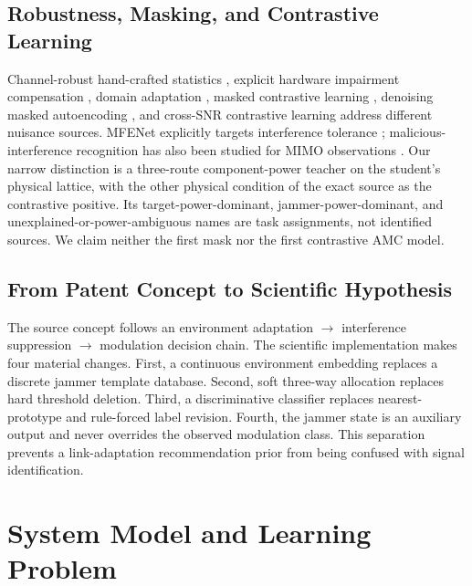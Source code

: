 \documentclass[letterpaper,journal]{IEEEtran}
\begin{document}
\subsection{Robustness, Masking, and Contrastive Learning}
Channel-robust hand-crafted statistics \cite{huang2024csqcc}, explicit hardware
impairment compensation \cite{ren2024crosssknet}, domain adaptation
\cite{wang2024sigda,li2026cgpcda}, masked contrastive learning
\cite{xiao2024mclhn}, denoising masked autoencoding
\cite{faysal2026denomae}, and cross-SNR contrastive learning
\cite{wu2026caic} address different nuisance sources.  MFENet explicitly
targets interference tolerance \cite{sun2025mfenet}; malicious-interference
recognition has also been studied for MIMO observations
\cite{zhang2026malicious}.  Our narrow distinction is a three-route
component-power teacher on the student's physical lattice, with the other
physical condition of the exact source as the contrastive positive.  Its
target-power-dominant, jammer-power-dominant, and
unexplained-or-power-ambiguous names are task assignments, not identified
sources.  We claim neither the first mask nor the first contrastive AMC model.

\subsection{From Patent Concept to Scientific Hypothesis}
The source concept follows an environment adaptation $\rightarrow$
interference suppression $\rightarrow$ modulation decision chain.  The
scientific implementation makes four material changes.  First, a continuous
environment embedding replaces a discrete jammer template database. Second,
soft three-way allocation replaces hard threshold deletion. Third, a
discriminative classifier replaces nearest-prototype and rule-forced label
revision. Fourth, the jammer state is an auxiliary output and never overrides
the observed modulation class.  This separation prevents a link-adaptation
recommendation prior from being confused with signal identification.

\section{System Model and Learning Problem}
\end{document}
